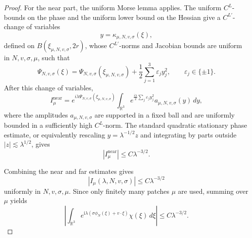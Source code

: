\documentclass[10pt,a4paper]{amsart}
\newcommand{\ii}{\mathrm{i}}
\begin{document}
\begin{proof}
For the near part, the uniform Morse lemma applies. The uniform
\(C^L\)-bounds on the phase and the uniform lower bound on the Hessian
give a \(C^{L'}\)-change of variables
\[
       y=\kappa_{\mu,N,v,\sigma}(\xi),
\]
defined on \(B(\xi_{\mu,N,v,\sigma},2r)\), whose \(C^{L'}\)-norms and
Jacobian bounds are uniform in \(N,v,\sigma,\mu\), such that
\[
       \Psi_{N,v,\sigma}(\xi)
       =
       \Psi_{N,v,\sigma}(\xi_{\mu,N,v,\sigma})
       +
       \frac12\sum_{j=1}^3 \varepsilon_j y_j^2,
       \qquad
       \varepsilon_j\in\{\pm1\}.
\]
After this change of variables,
\[
       I_{\mu}^{\mathrm{near}}
       =
       e^{i\lambda\Psi_{N,v,\sigma}(\xi_{\mu,N,v,\sigma})}
       \int_{\mathbb R^3}
          e^{\frac{i\lambda}{2}\sum_j\varepsilon_j y_j^2}
          a_{\mu,N,v,\sigma}(y)\,dy,
\]
where the amplitudes \(a_{\mu,N,v,\sigma}\) are supported in a fixed ball
and are uniformly bounded in a sufficiently high \(C^L\)-norm. The
standard quadratic stationary phase estimate, or equivalently rescaling
\(y=\lambda^{-1/2}z\) and integrating by parts outside \(|z|\lesssim
\lambda^{1/2}\), gives
\[
       |I_{\mu}^{\mathrm{near}}|\le C\lambda^{-3/2}.
\]

Combining the near and far estimates gives
\[
       |I_\mu(\lambda,N,v,\sigma)|\le C\lambda^{-3/2}
\]
uniformly in \(N,v,\sigma,\mu\). Since only finitely many patches
\(\mu\) are used, summing over \(\mu\) yields
\[
   \left|
   \int_{\mathbb R^3}
        e^{\ii\lambda(\sigma\phi_N(\xi)+v\cdot\xi)}
        \chi(\xi)\,d\xi
   \right|
   \le C\lambda^{-3/2}.
\]

\end{proof}
\end{document}

